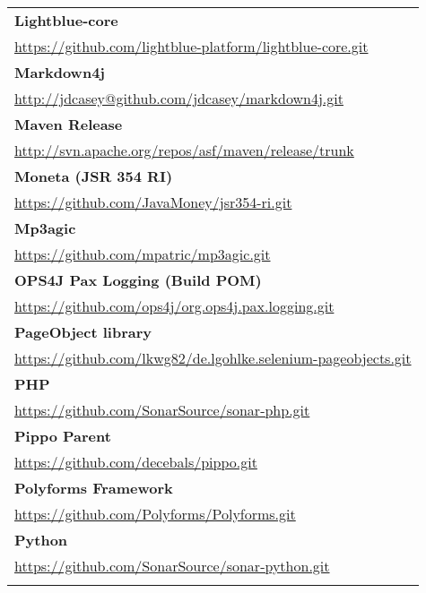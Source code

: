 \begin{table}[]
\small
\begin{tabular}{|p{130mm}|}
\hline 
\bf Lightblue-core                                     \\ \url{https://github.com/lightblue-platform/lightblue-core.git}                     \\ \hline \bf
Markdown4j                                         \\ \url{http://jdcasey@github.com/jdcasey/markdown4j.git}                             \\ \hline \bf
Maven Release                                      \\ \url{http://svn.apache.org/repos/asf/maven/release/trunk}                          \\ \hline \bf
Moneta (JSR 354 RI)                                \\ \url{https://github.com/JavaMoney/jsr354-ri.git}                                   \\ \hline \bf
Mp3agic                                            \\ \url{https://github.com/mpatric/mp3agic.git}                                       \\ \hline \bf
OPS4J Pax Logging (Build POM)                      \\ \url{https://github.com/ops4j/org.ops4j.pax.logging.git}                       \\ \hline \bf
PageObject library                                 \\ \url{https://github.com/lkwg82/de.lgohlke.selenium-pageobjects.git}                \\ \hline \bf
PHP                                                \\ \url{https://github.com/SonarSource/sonar-php.git}                                 \\ \hline \bf
Pippo Parent                                       \\ \url{https://github.com/decebals/pippo.git}                                        \\ \hline \bf
Polyforms Framework                                \\ \url{https://github.com/Polyforms/Polyforms.git}                                   \\ \hline \bf
Python                                             \\ \url{https://github.com/SonarSource/sonar-python.git}                              \\ \hline \bf

\end{tabular}
\end{table}
